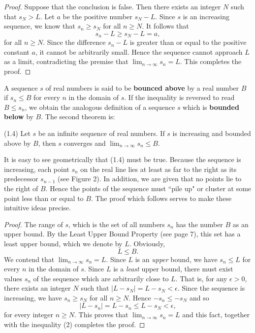 \begin{proof}
Suppose that the conclusion is false. Then there exists an integer $N$ such that $s_N > L$. Let $a$ be the positive number $s_N - L$. Since $s$ is an increasing sequence, we know that $s_n  \geq s_N$ for all $n \geq N$. It follows that 
$$
s_n - L \geq s_N - L = a,
$$
for all $n \geq N$. Since the difference $s_n - L$ is greater than or equal to the positive constant $a$, it cannot be arbitrarily small. Hence the sequence cannot approach $L$ as a limit, contradicting the premise that $\lim_{n \rightarrow \infty} s_n = L$. This completes the proof.
\end{proof}

A sequence $s$ of real numbers is said to be \textbf{bounced above} by a real number $B$ if $s_n \leq B$ for every $n$ in the domain of $s$. If the inequality is reversed to read $B \leq s_n$, we obtain the analogous definition of a sequence $s$ which is \textbf{bounded below} by $B$. The second theorem is:


\begin{theorem}
(1.4) Let $s$ be an infinite sequence of real numbers. If $s$ is increasing and bounded above by $B$, then $s$ converges and $\lim_{n \rightarrow \infty} s_n \leq B$.
\end{theorem}

It is easy to see geometrically that (1.4) must be true. Because the sequence is increasing, each point $s_n$ on the real line lies at least as far to the right as its predecessor $s_{n-1}$ (see Figure 2). In addition, we are given that no points lie to the right of $B$. Hence the points of the sequence must ``pile up" or cluster at some point less than or equal to $B$. The proof which follows serves to make these intuitive ideas precise.


\begin{proof}
The range of $s$, which is the set of all numbers $s_n$ has the number $B$ as an upper bound. By the Least Upper Bound Property (see page 7), this set has a least upper bound, which we denote by $L$. Obviously,
\begin{equation}
L \leq B. 
\label{eq9.1.2}
\end{equation}
We contend that $\lim_{n \rightarrow \infty} s_n = L$. Since $L$ is an \textit{upper} bound, we have $s_n \leq L$ for every $n$ in the domain of $s$. Since $L$ is a \textit{least} upper bound, there must exist values $s_n$ of the sequence which are arbitrarily close to $L$. That is, for any $\epsilon > 0$, there exists an integer $N$ such that $|L - s_N| = L - s_N < \epsilon$. Since the sequence is increasing, we have $s_n \geq s_N$ for all $n \geq N$. Hence $-s_n \leq -s_N$ and so
$$
| L - s_n | = L - s_n \leq L - s_N < \epsilon , 
$$
for every integer $n \geq N$. This proves that $\lim_{n \rightarrow \infty} s_n = L$ and this fact, together with the inequality (2) completes the proof.
\end{proof}

